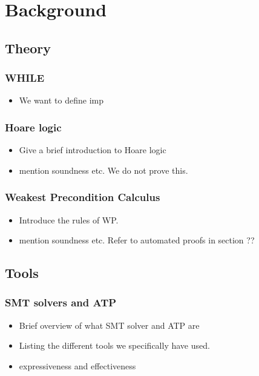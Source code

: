 \section{Background}


\subsection{Theory}

\subsubsection{WHILE}
\begin{itemize}
\item We want to define imp
\end{itemize}

\subsubsection{Hoare logic}
\begin{itemize}
  \item Give a brief introduction to Hoare logic
\item mention soundness etc. We do not prove this.
\end{itemize}

\subsubsection{Weakest Precondition Calculus}
\begin{itemize}
\item Introduce the rules of WP.
\item mention soundness etc. Refer to automated proofs in section ??
\end{itemize}

\subsection{Tools}

\subsubsection{SMT solvers and ATP}
\begin{itemize}
  \item Brief overview of what SMT solver and ATP are
  \item Listing the different tools we specifically have used.
  \item expressiveness and effectiveness
\end{itemize}

